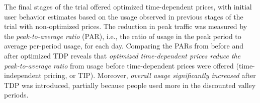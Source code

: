 The final stages of the trial offered optimized time-dependent prices, with initial user behavior estimates based on the usage observed in previous stages of the trial with non-optimized prices.  The reduction in peak traffic was measured by the \emph{peak-to-average ratio} (PAR), i.e., the ratio of usage in the peak period to average per-period usage, for each day.  Comparing the PARs from before and after optimized TDP reveals that \emph{optimized time-dependent prices reduce the peak-to-average ratio} from usage before time-dependent prices were offered (time-independent pricing, or TIP).  Moreover, \emph{overall usage significantly increased} after TDP was introduced, partially because people used more in the discounted valley periods. %

